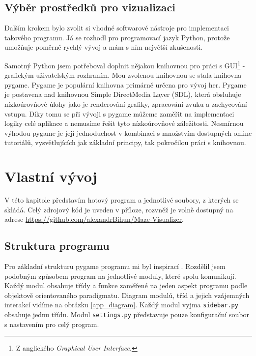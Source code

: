 \documentclass[12pt]{report}			%
\begin{document}
			\section{Výběr prostředků pro vizualizaci}
			Dalším krokem bylo zvolit si vhodné softwarové nástroje pro implementaci takového programu. Já se rozhodl pro programovací jazyk Python, protože umožňuje poměrně rychlý vývoj a  mám s ním největší zkušenosti.
			
			Samotný Python jsem potřeboval doplnit nějakou knihovnou pro práci s GUI\footnote{Z anglického \emph{Graphical User Interface}.} - grafickým uživatelským rozhraním. Mou zvolenou knihovnou se stala knihovna pygame. Pygame je populární knihovna primárně určena pro vývoj her.  
			Pygame je postavena nad knihovnou Simple DirectMedia Layer (SDL), která obsluhuje nízkoúrovňové úlohy jako je renderování grafiky, zpracování zvuku a zachycování vstupu. Díky tomu se při vývoji s pygame můžeme zaměřit na implementaci logiky celé aplikace a nemusíme řešit tyto nízkoúrovňové záležitosti.
			Nesmírnou výhodou pygame je její jednoduchost v kombinaci s množstvím dostupných online tutoriálů, vysvětlujících jak základní principy, tak pokročilou práci s knihovnou.
			\cite{pygame_intro} \cite{pygame_about}
			
		
		\chapter{Vlastní vývoj}
		V této kapitole představím hotový program a jednotlivé soubory, z kterých se skládá. Celý zdrojový kód je uveden v příloze, rozvněž je volně dostupný na adrese \url{https://github.com/alexandrBihun/Maze-Visualizer}.
			\section{Struktura programu}
			Pro základní strukturu pygame programu mi byl inspirací \cite{yt_zelda}. Rozdělil jsem podobným způsobem program na jednotlivé moduly, které spolu komunikují. Každý modul obsahuje třídy a funkce zaměřené na jeden aspekt programu podle objektově orientovaného paradigmatu. Diagram modulů, tříd a jejich vzájemných interakcí vidíme na obrázku \ref{app_diagram}. Každý modul vyjma \texttt{sidebar.py} obsahuje jednu třídu. Modul \texttt{settings.py} představuje pouze konfigurační soubor s nastavením pro celý program.
			
\end{document}
